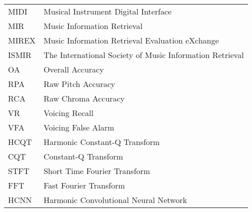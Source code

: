 \documentclass[12pt,a4paper]{report}
\begin{document}



\tableofcontents











\listoffigures

\listoftables


\begin{tabular}{ll}
MIDI & Musical Instrument Digital Interface \\
MIR & Music Information Retrieval \\
MIREX & Music Information Retrieval Evaluation eXchange \\
ISMIR & The International Society of Music Information Retrieval \\
OA & Overall Accuracy \\
RPA & Raw Pitch Accuracy \\
RCA & Raw Chroma Accuracy \\
VR & Voicing Recall \\
VFA & Voicing False Alarm \\
HCQT & Harmonic Constant-Q Transform \\
CQT & Constant-Q Transform \\
STFT & Short Time Fourier Transform \\
FFT & Fast Fourier Transform \\
HCNN & Harmonic Convolutional Neural Network \\
\end{tabular}

\end{document}
